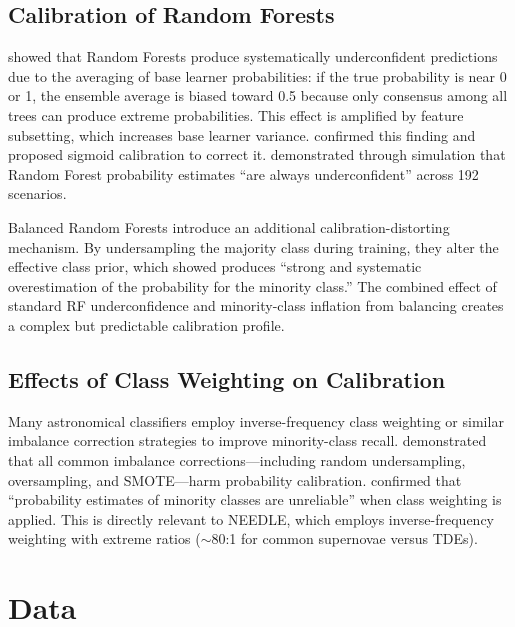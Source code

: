 \documentclass[twocolumn]{aastex631}
\begin{document}
\subsection{Calibration of Random Forests}

\citet{niculescumizil2005} showed that Random Forests produce systematically underconfident predictions due to the averaging of base learner probabilities: if the true probability is near 0 or 1, the ensemble average is biased toward 0.5 because only consensus among all trees can produce extreme probabilities. This effect is amplified by feature subsetting, which increases base learner variance. \citet{bostrom2008} confirmed this finding and proposed sigmoid calibration to correct it. \citet{loecher2024} demonstrated through simulation that Random Forest probability estimates ``are always underconfident'' across 192 scenarios.

Balanced Random Forests \citep{chen2004} introduce an additional calibration-distorting mechanism. By undersampling the majority class during training, they alter the effective class prior, which \citet{vandengoorbergh2022} showed produces ``strong and systematic overestimation of the probability for the minority class.'' The combined effect of standard RF underconfidence and minority-class inflation from balancing creates a complex but predictable calibration profile.

\subsection{Effects of Class Weighting on Calibration}

Many astronomical classifiers employ inverse-frequency class weighting or similar imbalance correction strategies to improve minority-class recall. \citet{vandengoorbergh2022} demonstrated that all common imbalance corrections---including random undersampling, oversampling, and SMOTE---harm probability calibration. \citet{fernando2021} confirmed that ``probability estimates of minority classes are unreliable'' when class weighting is applied. This is directly relevant to NEEDLE, which employs inverse-frequency weighting with extreme ratios ($\sim$80:1 for common supernovae versus TDEs).


\section{Data} \label{sec:data}
\end{document}
